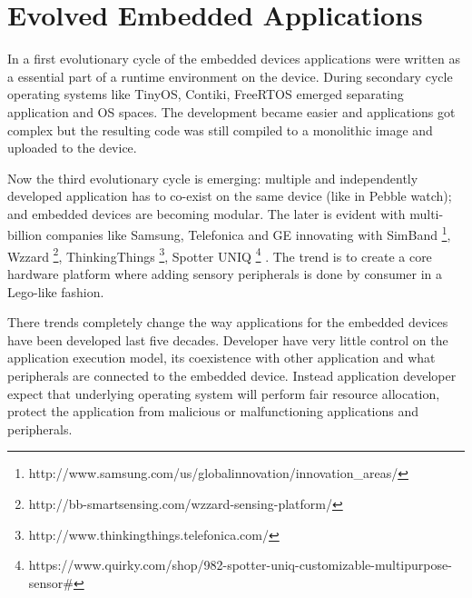 \section{Evolved Embedded Applications}
In a first evolutionary cycle of the embedded devices applications were written
as a essential part of a runtime environment on the device. During secondary
cycle operating systems like TinyOS, Contiki, FreeRTOS emerged separating
application and OS spaces. The development became easier  and applications
got complex but the resulting code was still compiled to a monolithic image and
uploaded to the device.

Now the third evolutionary cycle is emerging: multiple and independently
developed application has to co-exist on the same device (like in Pebble watch);
and embedded devices are becoming modular. The later is evident with
multi-billion companies like Samsung, Telefonica and GE innovating with SimBand
\footnote{http://www.samsung.com/us/globalinnovation/innovation_areas/}, Wzzard
\footnote{http://bb-smartsensing.com/wzzard-sensing-platform/}, ThinkingThings
\footnote{http://www.thinkingthings.telefonica.com/}, Spotter UNIQ
\footnote{https://www.quirky.com/shop/982-spotter-uniq-customizable-multipurpose-sensor#}
. The trend is to create a core hardware platform where adding sensory
peripherals is done by consumer in a Lego-like fashion.

There trends completely change the way applications for the embedded devices
have been developed last five decades. Developer have very little control on the
application execution model, its coexistence with other application and what
peripherals are connected to the embedded device. Instead application developer
expect that underlying operating system will perform fair resource allocation,
protect the application from malicious or malfunctioning applications and
peripherals. 




